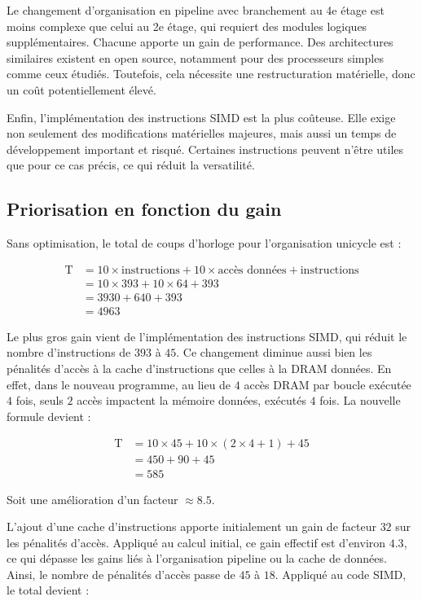 \documentclass[a11paper]{article}
\begin{document}
Le changement d’organisation en pipeline avec branchement au 4e étage est moins
complexe que celui au 2e étage, qui requiert des modules logiques supplémentaires.
Chacune apporte un gain de performance. Des architectures similaires existent en
open source, notamment pour des processeurs simples comme ceux étudiés. Toutefois,
cela nécessite une restructuration matérielle, donc un coût potentiellement élevé.

Enfin, l’implémentation des instructions SIMD est la plus coûteuse. Elle exige
non seulement des modifications matérielles majeures, mais aussi un temps de
développement important et risqué. Certaines instructions peuvent n’être utiles
que pour ce cas précis, ce qui réduit la versatilité.

\subsection{Priorisation en fonction du gain}

Sans optimisation, le total de coups d'horloge pour l’organisation unicycle est :

\begin{align}
  \text{T} &= 10 \times \text{instructions} + 10 \times \text{accès données} + \text{instructions} \\
  &= 10 \times 393 + 10 \times 64 + 393 \\
  &= 3930 + 640 + 393 \\
  &= 4963
\end{align}

Le plus gros gain vient de l’implémentation des instructions SIMD, qui réduit
le nombre d’instructions de $393$ à $45$. Ce changement diminue aussi bien les
pénalités d’accès à la cache d’instructions que celles à la DRAM données.
En effet, dans le nouveau programme, au lieu de $4$ accès DRAM par boucle exécutée
$4$ fois, seuls $2$ accès impactent la mémoire données, exécutés $4$ fois.
La nouvelle formule devient :

\begin{align}
  \text{T} &= 10 \times 45 + 10 \times (2 \times 4 + 1) + 45 \\
  &= 450 + 90 + 45 \\
  &= 585
\end{align}

Soit une amélioration d’un facteur $\approx 8.5$.

L’ajout d’une cache d’instructions apporte initialement un gain de facteur $32$
sur les pénalités d’accès. Appliqué au calcul initial, ce gain effectif est
d’environ $4.3$, ce qui dépasse les gains liés à l’organisation pipeline ou
la cache de données. Ainsi, le nombre de pénalités d’accès passe de $45$ à $18$.
Appliqué au code SIMD, le total devient :
\end{document}
